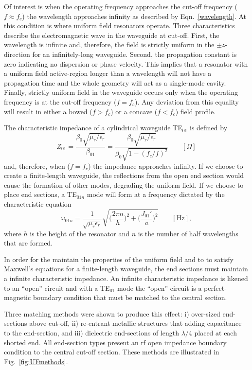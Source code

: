 Of interest is when the operating frequency approaches the cut-off frequency ($f \approx f_c$) the wavelength approaches infinity as described by Eqn.~\ref{wavelength}. At this condition is where uniform field resonators operate. Three characteristics describe the electromagnetic wave in the waveguide at cut-off. First, the wavelength is infinite and, therefore, the field is strictly uniform in the $\pm z$-direction for an infinitely-long waveguide. Second, the propagation constant is zero indicating no dispersion or phase velocity. This implies that a resonator with a uniform field active-region longer than a wavelength will not have a propagation time and the whole geometry will act as a single-mode cavity.  Finally, strictly uniform field in the waveguide occurs only when the operating frequency is at the cut-off frequency ($f=f_c$). Any deviation from this equality will result in either a bowed ($f>f_c$) or a concave ($f<f_c$) field profile.

The characteristic impedance of a cylindrical waveguide TE$_{01}$ is defined by 
\begin{equation}
    Z_{01} = \frac{\beta_0 \sqrt{\mu_r/ \epsilon_r}}{\beta_{01}} =\frac{\beta_0 \sqrt{\mu_r/ \epsilon_r}}{\beta_0 \sqrt{1-(f_c/f)^2}} \qquad [\Omega]
\end{equation}
and, therefore, when ($f=f_c$) the impedance approaches infinity. If we choose to create a finite-length waveguide, the reflections from the open end section would cause the formation of other modes, degrading the uniform field. If we choose to place end sections, a TE$_{01n}$ mode will form at a frequency dictated by the characteristic equation
\begin{equation}
    \omega_{01n} = \frac{1}{\sqrt{\mu_r \epsilon_r}}\sqrt{\bigg(\frac{2 \pi n}{h}\bigg)^2+\bigg(\frac{J_{01}'}{a}\bigg)^2} \qquad [\text{Hz}],
\end{equation}
where $h$ is the height of the resonator and $n$ is the number of half wavelengths that are formed.

In order for the maintain the properties of the uniform field and to to satisfy Maxwell's equations for a finite-length waveguide, the end sections must maintain a infinite characteristic impedance. An infinite characteristic impedance is likened to an ``open'' circuit and with a TE$_{01}$ mode the ``open'' circuit is a perfect-magnetic boundary condition that must be matched to the central section. 

Three matching methods were shown to produce this effect: i) over-sized end-sections above cut-off, ii) re-entrant metallic structures that adding capacitance to the end-section, and iii) dielectric end-sections of length $\lambda/4$ placed at each shorted end. All end-section types present an rf open impedance boundary condition to the central cut-off section. These methods are illustrated in Fig.~\ref{fig:UFmethods}.

